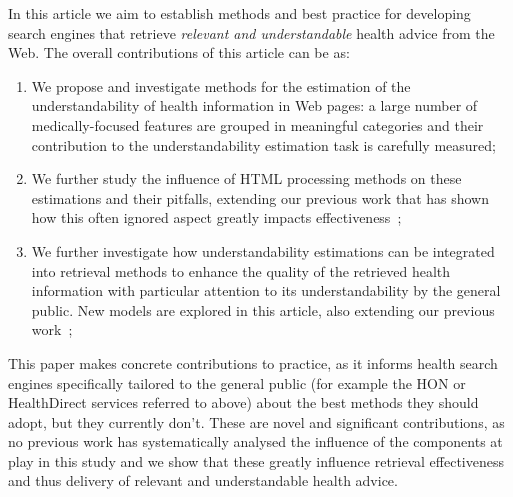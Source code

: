 In this article we aim to establish methods and best practice for developing search engines that retrieve \textit{relevant and understandable} health advice from the Web. The overall contributions of this article can be  as:
\begin{enumerate}
\item We propose and investigate methods for the estimation of the understandability of health information in Web pages: a large number of medically-focused features are grouped in meaningful categories and their contribution to the understandability estimation task is carefully measured;
\item We further study the influence of HTML processing methods on these estimations and their pitfalls, extending our previous work that has shown how this often ignored aspect greatly impacts effectiveness~\cite{palotti15};
\item We further investigate how understandability estimations can be integrated into retrieval methods to enhance the quality of the retrieved health information with particular attention to its understandability by the general public. New models are explored in this article, also extending our previous work~\cite{palotti2016ranking};
\end{enumerate}

This paper makes concrete contributions to practice, as it informs health search engines specifically tailored to the general public (for example the HON or HealthDirect services referred to above) about the best methods they should adopt, but they currently don't. These are novel and significant contributions, as no previous work has systematically analysed the influence of the components at play in this study and we show that these greatly influence retrieval effectiveness and thus delivery of relevant and understandable health advice.


